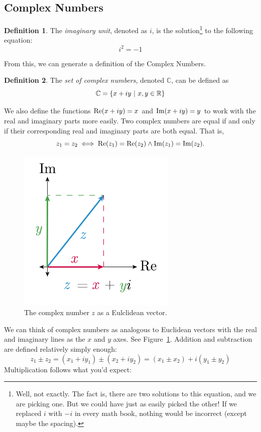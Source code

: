 \documentclass[10pt]{scrartcl}
\numberwithin{equation}{subsection}
\theoremstyle{definition}
\newtheorem{definition}{Definition}[section]
\theoremstyle{remark}
\newenvironment{definitionSR}
{
\begin{siderules}
\begin{definition}
}
{
\end{definition}
\end{siderules}
}
\newcommand{\Reals}{\mathbb{R}}
\newcommand{\Complex}{\mathbb{C}}
\newcommand{\ReP}[1]{
	\mathrm{Re}\pqty{#1}
}
\newcommand{\ImP}[1]{
	\mathrm{Im}\pqty{#1}
}
\begin{document}
\subsection{Complex Numbers}
\label{ComplexNumbers}
\begin{definitionSR}
	The \emph{imaginary unit}, denoted as $i$, is the
	solution\footnote{Well, not exactly. The fact is, there are two
	solutions to this equation, and we are picking one. But we could have
	just as easily picked the other! If we replaced $i$ with $-i$ in every math
	book, nothing would be incorrect (except maybe the spacing).} to the following
	equation:
\[
i^2 = -1
\]
\end{definitionSR}
From this, we can generate a definition of the Complex Numbers.
\begin{definitionSR}
The \emph{set of complex numbers}, denoted $\Complex$, can be defined as
\[
\Complex = \Bqty{x+iy ~ | ~ x,y \in \Reals}
\]
\end{definitionSR}
We also define the functions $\ReP{x+iy}=x$ and $\ImP{x+iy}=y$ to work with the
real and imaginary parts more easily.
Two complex numbers are equal if and only if their corresponding real and
imaginary parts are both equal. That is,
\[
z_1 = z_2 \iff \ReP{z_1} = \ReP{z_2} \wedge \ImP{z_1} = \ImP{z_2}.
\]
\begin{figure}[h]
	\centering
	\caption{The complex number $z$ as a Eulclidean vector.}
	\label{fig:complexAddition}
	\includegraphics[width=3in]{complex_number_diagram-01}
\end{figure}
We can think of complex numbers as analogous to Euclidean vectors with
the real and imaginary lines as the $x$ and $y$ axes. See Figure~\ref{fig:complexAddition}. 
Addition and subtraction are defined relatively simply enough:
\[
z_1 \pm z_2 = (x_1 + i y_1) \pm (x_2 + i y_2) = (x_1 \pm x_2) + i (y_1 \pm y_2)
\]
Multiplication follows what you'd expect:
\end{document}
